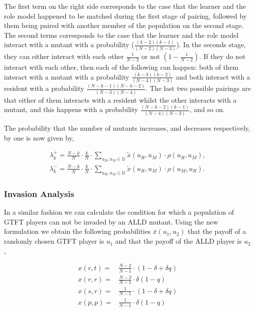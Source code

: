 \documentclass[11pt]{article}
\theoremstyle{plainCl1}
\theoremstyle{plainCl2}
\begin{document}
The first term on the right side corresponds to the case that the learner and
the role model happened to be matched during the first stage of pairing,
followed by them being paired with another member of the population on the
second stage. The second terms corresponds to the case that the learner and the
role model interact with a mutant with a probability ($\frac{\left(k - 2\right)
\left(k - 1\right)}{(N\!-\!2)(N\!-\!3)}$). In the seconds stage, they can either
interact with each other $\frac{1}{N - 2}$ or not $(1 - \frac{1}{N - 2})$. If
they do not interact with each other, then each of the following can happen:
both of them interact with a mutant with a probability
$\frac{(k-3)(k-2)}{(N-4)(N-3)}$ and both interact with a resident with a
probability $\frac{(N-k-1)(N-k-2)}{(N-3)(N-4)}$. The last two possible pairings
are that either of them interacts with a resident whilst the other interacts
with a mutant, and this happens with a probability
$\frac{(N-k-2)(k-1)}{(N-4)(N-3)}$, and so on.

The probability that the number of mutants increases, and decreases
respectively, by one is now given by,

\begin{align}\label{eq:ratio_limited}
\lambda^+_k=\frac{N\!-\!k}{N}\cdot \frac{k}{N}\cdot \sum_{u_{R},u_{M}\in\mathcal{U}} \tilde{x}(u_{R},u_{M})\cdot \rho(u_{R},u_{M}), \\
\lambda^-_k=\frac{N\!-\!k}{N}\cdot \frac{k}{N}\cdot \sum_{u_{R},u_{M}\in\mathcal{U}} \tilde{x}(u_{R},u_{M})\cdot \rho(u_{M},u_{R}).
\end{align}


\subsubsection*{Invasion Analysis}

In a similar fashion we can calculate the condition for which a population of
GTFT players can not be invaded by an ALLD mutant. Using the new formulation we
obtain the following probabilities \(\bar{x}(u_1, u_2)\) that the payoff of a randomly
chosen GTFT player is \(u_1\) and that the payoff of the ALLD player is \(u_2\),

\begin{align*}
  x(r, t) = & \frac{N - 2}{N - 1} \cdot (1 - \delta + \delta q)\\
  x(r, r) = & \frac{N - 2}{N - 1} \cdot \delta (1 - q) \\
  x(s, r) = & \frac{1}{N - 1} \cdot (1 - \delta + \delta q) \\
  x(p, p) = & \frac{1}{N - 1} \cdot \delta (1 - q)
\end{align*}
\end{document}
